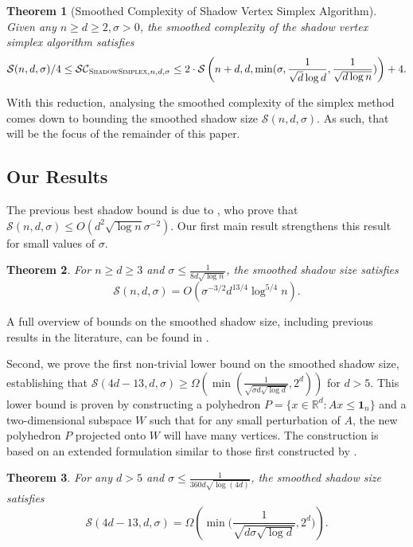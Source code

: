 \documentclass{article}\usepackage[a4paper,margin=20mm]{geometry}
\newtheorem{theorem}{Theorem}\newtheorem{lemma}[theorem]{Lemma}\newtheorem{proposition}[theorem]{Proposition}\newtheorem{corollary}[theorem]{Corollary}\newtheorem{definition}[theorem]{Definition}\newtheorem{claim}[theorem]{Claim}\newtheorem{remark}[theorem]{Remark}\newtheorem{observation}[theorem]{Observation}\newtheorem{conjecture}[theorem]{Conjecture}\newtheorem{example}[theorem]{Example}
\newcommand{\R}{\mathbb R}
\begin{document}
\begin{theorem}[Smoothed Complexity of Shadow Vertex Simplex Algorithm]
    Given any $n \geq d \geq 2, \sigma > 0$, the smoothed complexity of the shadow vertex simplex algorithm satisfies
    \begin{align*}
        \mathcal{S}(n, d, \sigma)/4 \leq \mathcal{SC}_{\textsc{ShadowSimplex}, n, d, \sigma} \leq 2\cdot\mathcal{S}\left(n + d, d, \min(\sigma, \frac{1}{\sqrt{d} \log d}, \frac{1}{\sqrt{d \log n}}) \right) + 4.
    \end{align*}
\end{theorem}

With this reduction, analysing the smoothed complexity of the simplex method
comes down to bounding the smoothed shadow size $\mathcal S(n,d,\sigma)$.
As such, that will be the focus of the remainder of this paper.

\subsection{Our Results}
The previous best shadow bound is due to \cite{DH18}, who prove that $\mathcal S(n,d,\sigma) \leq O(d^2 \sqrt{\log n}\sigma^{-2})$.
Our first main result strengthens this result for small values of $\sigma$.
\begin{theorem}
    For $n \geq d \geq 3$ and $\sigma \leq \frac{1}{8d\sqrt{\log n}}$,
    the smoothed shadow size satisfies
    \[
        \mathcal S(n,d,\sigma) = O\left( \sigma^{-3/2} d^{13/4} \log^{5/4} n \right).
    \]
\end{theorem}
A full overview of bounds on the smoothed shadow size, including previous results in the literature, can be found in
.

Second, we prove the first non-trivial lower bound on the smoothed shadow size, establishing that
$\mathcal S(4d-13,d,\sigma) \geq \Omega(\min(\frac{1}{\sqrt{\sigma d \sqrt{\log d}}}, 2^d))$
for $d > 5$. This lower bound is proven by constructing a polyhedron
$P = \{x \in \R^d : Ax \leq \mathbf 1_n\}$ and a two-dimensional subspace $W$ such that
for any small perturbation of $A$, the new polyhedron $P$ projected onto $W$ will have many vertices.
The construction is based on an extended formulation similar to those first constructed by
\cite{BN01, glineur}.

\begin{theorem}
    For any $d > 5$ and $\sigma \leq \frac{1}{360d\sqrt{\log(4d)}}$,
    the smoothed shadow size satisfies
    \[
        \mathcal S(4d-13,d,\sigma) = \Omega \left(\min \Big(\frac{1}{\sqrt{d\sigma\sqrt{\log d}}},2^d \Big) \right).
    \]
\end{theorem}
\end{document}

